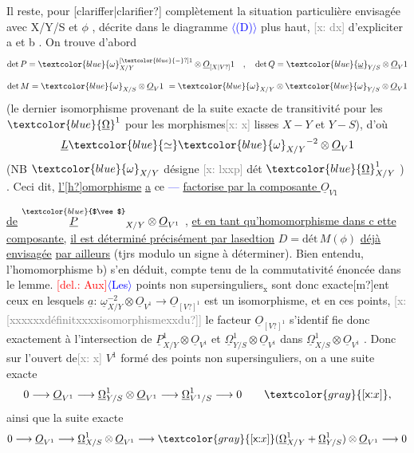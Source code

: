 \documentclass[11pt]{article}
\newcommand{\scanpage}[1]{\par\bigskip\noindent{\small\sffamily[scan #1]}\par}
\newcommand{\mspage}[1]{{\small\sffamily[p.\,#1]}}
\newcommand{\hand}[1]{\textcolor{blue}{#1}}
\newcommand{\inserted}[2][]{\textcolor{blue}{$\langle$#2$\rangle$}}
\newcommand{\deleted}[1]{\textcolor{red}{[\textsf{del.:} #1]}}
\newcommand{\xout}[1]{\textcolor{gray}{[\textsf{x:} #1]}}
\newcommand{\uline}[1]{\underline{#1}}
\newcommand{\unsure}[1]{[#1?]}
\begin{document}
Il reste, pour \unsure{clariffer|clarifier} complètement la situation particulière
envisagée avec X/Y/S et $\phi$ , décrite dans le diagramme \inserted{(D)} plus haut, \xout{dx}
d'expliciter a et b . On trouve d'abord
\[ \det P = \hand{\omega}_{X/Y}^{\unsure{\hand{-}}1} \otimes \underline{O}_{\unsure{X|V}}1 \quad , \quad \det Q = \hand{\underline{\omega}}_{Y/S} \otimes \underline{O}_{V}1 \]
\[ \det M = \hand{\omega}_{X/S} \otimes \underline{O}_{V}1 \ = \hand{\omega}_{X/Y} \otimes \hand{\omega}_{Y/S} \otimes \underline{O}_{V}1 \]
(le dernier isomorphisme provenant de la suite exacte de transitivité
pour les $\hand{\underline{\Omega}}^1$ pour les morphismes\xout{x} lisses $X-Y$ et $Y-S$), d'où
\[ \underline{L} \hand{\simeq} \hand{\omega}_{X/Y}{}^{-2} \otimes \underline{O}_{V}1 \]
(NB $\hand{\omega}_{X/Y}$ désigne \xout{lxxp} dét $\hand{\underline{\Omega}}^1_{X/Y}$ ) . Ceci dit, \uline{l'\unsure{h}omorphisme} \uline{a} ce \hand{---}
\uline{factorise par la composante $\underline{O}_{V1}$}

\mspage{146}

\clearpage
\scanpage{25/147}
\mspage{8}

\uline{de} $\overset{\hand{$\vee$}}{\underline{P}}_{X/Y}\otimes\underline{O}_{V^1}$ , \uline{et en tant qu'homomorphisme dans c ette composante,}
\uline{il est déterminé précisément par lasedtion} $D = \text{dét}\,M(\phi)$ \uline{déjà envisagée}
\uline{par ailleurs} (tjrs modulo un signe à déterminer). Bien entendu,
l'homomorphisme b) s'en déduit, compte tenu de la commutativité énoncée
dans le lemme. \deleted{Aux}\inserted{Les} points non supersinguliers$_{\text{x}}$ sont donc exacte\unsure{m}ent
ceux en lesquels $\underline{a}$: $\underline{\omega}^{-2}_{X/Y}\otimes\underline{O}_{V^1}\longrightarrow\underline{O}_{\unsure{V}^1}$ est un isomorphisme, et en
ces points, \xout{\unsure{xxxxxxdéfinitxxxxisomorphismexxdu}} le facteur $\underline{O}_{\unsure{V}^1}$ s'identif
fie donc exactement à l'intersection de $\underline{P}^1_{X/Y}\otimes\underline{O}_{V^1}$ et $\underline{\Omega}^1_{Y/S}\otimes\underline{O}_{V^1}$
dans $\underline{\Omega}^1_{X/S}\otimes\underline{O}_{V^1}$ . Donc sur l'ouvert de\xout{x} $V^1$ formé des points non
supersinguliers, on a une suite exacte
\[ 0\longrightarrow\underline{O}_{V^1}\longrightarrow\underline{\Omega}^1_{Y/S}\otimes\underline{O}_{V^1}\longrightarrow\underline{\Omega}^1_{V^1/S}\longrightarrow 0 \qquad \xout{x}, \]
ainsi que la suite exacte
\[ 0\longrightarrow\underline{O}_{V^1}\longrightarrow\underline{\Omega}^1_{X/S}\otimes\underline{O}_{V^1}\longrightarrow\xout{x}(\underline{\Omega}^1_{X/Y}+\underline{\Omega}^1_{Y/S})\otimes\underline{O}_{V^1}\longrightarrow 0 \]
\end{document}
